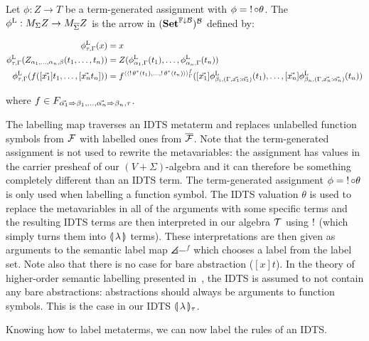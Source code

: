 \begin{definition}
  Let $\phi : Z \to T$ be a term-generated assignment with
  $\phi = \mathop{!} {\mathbin{\circ}} \theta$. The 
  $\phi^{\mathrm{L}} : M_\Sigma Z \to M_{\overline{\Sigma}} Z$ is the arrow in
  $(\mathbf{Set}^{\mathbb{F}\downarrow\mathcal{B}})^{\mathcal{B}}$ defined by:
  
  \begin{align*}
    \phi^{\mathrm{L}}_{\tau,\Gamma}(x) &= x \\
    \phi^{\mathrm{L}}_{\tau,\Gamma}(Z_{\alpha_1,\ldots,\alpha_n,\beta}(t_1, \ldots, t_n))
    &= Z(\phi^{\mathrm{L}}_{\alpha_1,\Gamma}(t_1), \ldots, \phi^{\mathrm{L}}_{\alpha_n,\Gamma}(t_n)) \\
    \phi^{\mathrm{L}}_{\tau,\Gamma}(f([\vec{x_1}] t_1, \ldots, [\vec{x_n} t_n]))
    &= f^{\langle\langle\mathop{!}\theta^*(t_1), \ldots, \mathop{!}\theta^*(t_n)\rangle\rangle^f_\Gamma}([\vec{x_1}] \phi^{\mathrm{L}}_{\beta_i,(\Gamma,\vec{x_1} :
      \vec{\alpha_1})}(t_1), \ldots,
      [\vec{x_n}] \phi^{\mathrm{L}}_{\beta_n,(\Gamma,\vec{x_n} : \vec{\alpha_n})}(t_n))
  \end{align*}

  where
  $f \in F_{\vec{\alpha_1} \Rightarrow \beta_1, \ldots, \vec{\alpha_n} \Rightarrow \beta_n,
    \tau}$.
\end{definition}

The labelling map traverses an IDTS metaterm and replaces unlabelled
function symbols from $\mathcal{F}$ with labelled ones from $\overline{\mathcal{F}}$.  Note
that the term-generated assignment is not used to rewrite the
metavariables: the assignment has values in the carrier presheaf of our
$(V+\Sigma)$-algebra and it can therefore be something completely different
than an IDTS term. The term-generated assignment
$\phi = \mathop{!} {\mathbin{\circ}} \theta$ is only used when labelling a function
symbol. The IDTS valuation $\theta$ is used to replace the metavariables in
all of the arguments with some specific terms and the resulting IDTS terms
are then interpreted in our algebra $\mathcal{T}$ using $\mathop{!}$ (which simply
turns them into $\llparenthesis \, \lambda \, \rrparenthesis$ terms). These interpretations are then
given as arguments to the semantic label map $\angles{-}^f$ which chooses a
label from the label set. Note also that there is no case for bare
abstraction ($[x] t$). In the theory of higher-order semantic labelling
presented in~\cite{hamana2007higher}, the IDTS is assumed to not contain
any bare abstractions: abstractions should always be arguments to function
symbols. This is the case in our IDTS $\llparenthesis \, \lambda \, \rrparenthesis_\tau$.

Knowing how to label metaterms, we can now label the rules of an
IDTS.


